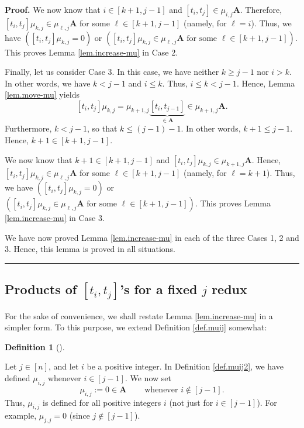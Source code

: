 \documentclass[numbers=enddot,12pt,final,onecolumn,notitlepage]{scrartcl}%
\theoremstyle{definition}
\newtheorem{defi}[theo]{Definition}
\newenvironment{definition}[1][]
{\begin{defi}[#1]\begin{leftbar}}
{\end{leftbar}\end{defi}}
\newenvironment{proof}[1][Proof]{\noindent\textbf{#1.} }{\ \rule{0.5em}{0.5em}}
\begin{document}
\begin{proof}
We now know that $i\in\left[  k+1,j-1\right]  $ and $\left[  t_{i}%
,t_{j}\right]  \in\mu_{i,j}\mathbf{A}$. Therefore, $\left[  t_{i}%
,t_{j}\right]  \mu_{k,j}\in\mu_{\ell,j}\mathbf{A}$ for some $\ell\in\left[
k+1,j-1\right]  $ (namely, for $\ell=i$). Thus, we have $\left(  \left[
t_{i},t_{j}\right]  \mu_{k,j}=0\right)  $ or $\left(  \left[  t_{i}%
,t_{j}\right]  \mu_{k,j}\in\mu_{\ell,j}\mathbf{A}\text{ for some }\ell
\in\left[  k+1,j-1\right]  \right)  $. This proves Lemma \ref{lem.increase-mu}
in Case 2.

Finally, let us consider Case 3. In this case, we have neither $k\geq j-1$ nor
$i>k$. In other words, we have $k<j-1$ and $i\leq k$. Thus, $i\leq k<j-1$.
Hence, Lemma \ref{lem.move-mu} yields%
\[
\left[  t_{i},t_{j}\right]  \mu_{k,j}=\mu_{k+1,j}\underbrace{\left[
t_{i},t_{j-1}\right]  }_{\in\mathbf{A}}\in\mu_{k+1,j}\mathbf{A}.
\]
Furthermore, $k<j-1$, so that $k\leq\left(  j-1\right)  -1$. In other words,
$k+1\leq j-1$. Hence, $k+1\in\left[  k+1,j-1\right]  $.

We now know that $k+1\in\left[  k+1,j-1\right]  $ and $\left[  t_{i}%
,t_{j}\right]  \mu_{k,j}\in\mu_{k+1,j}\mathbf{A}$. Hence, $\left[  t_{i}%
,t_{j}\right]  \mu_{k,j}\in\mu_{\ell,j}\mathbf{A}$ for some $\ell\in\left[
k+1,j-1\right]  $ (namely, for $\ell=k+1$). Thus, we have $\left(  \left[
t_{i},t_{j}\right]  \mu_{k,j}=0\right)  $ or $\left(  \left[  t_{i}%
,t_{j}\right]  \mu_{k,j}\in\mu_{\ell,j}\mathbf{A}\text{ for some }\ell
\in\left[  k+1,j-1\right]  \right)  $. This proves Lemma \ref{lem.increase-mu}
in Case 3.

We have now proved Lemma \ref{lem.increase-mu} in each of the three Cases 1, 2
and 3. Hence, this lemma is proved in all situations.
\end{proof}

\subsection{Products of $\left[  t_{i},t_{j}\right]  $'s for a fixed $j$
redux}

For the sake of convenience, we shall restate Lemma \ref{lem.increase-mu} in a
simpler form. To this purpose, we extend Definition \ref{def.muij} somewhat:

\begin{definition}
\label{def.muij2}Let $j\in\left[  n\right]  $, and let $i$ be a positive
integer. In Definition \ref{def.muij2}, we have defined $\mu_{i,j}$ whenever
$i\in\left[  j-1\right]  $. We now set
\[
\mu_{i,j}:=0\in\mathbf{A}\ \ \ \ \ \ \ \ \ \ \text{whenever }i\notin\left[
j-1\right]  .
\]
Thus, $\mu_{i,j}$ is defined for all positive integers $i$ (not just for
$i\in\left[  j-1\right]  $). For example, $\mu_{j,j}=0$ (since $j\notin\left[
j-1\right]  $).
\end{definition}
\end{document}
